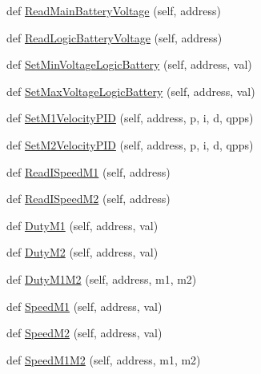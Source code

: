 \begin{DoxyCompactItemize}
\item 
def \mbox{\hyperlink{classtoxic__hardware_1_1roboclaw__3_1_1Roboclaw_abb5901cba752131303b0378bbaf59c38}{Read\+Main\+Battery\+Voltage}} (self, address)
\item 
def \mbox{\hyperlink{classtoxic__hardware_1_1roboclaw__3_1_1Roboclaw_aac164c773247f222999594aba2deae95}{Read\+Logic\+Battery\+Voltage}} (self, address)
\item 
def \mbox{\hyperlink{classtoxic__hardware_1_1roboclaw__3_1_1Roboclaw_adb683d1e84a0432cca192f662407904f}{Set\+Min\+Voltage\+Logic\+Battery}} (self, address, val)
\item 
def \mbox{\hyperlink{classtoxic__hardware_1_1roboclaw__3_1_1Roboclaw_a726fe4e542430464c2fc2bf14f5142a3}{Set\+Max\+Voltage\+Logic\+Battery}} (self, address, val)
\item 
def \mbox{\hyperlink{classtoxic__hardware_1_1roboclaw__3_1_1Roboclaw_a8ea4c0748b43e086bf7326ec1cd1d8f5}{Set\+M1\+Velocity\+P\+ID}} (self, address, p, i, d, qpps)
\item 
def \mbox{\hyperlink{classtoxic__hardware_1_1roboclaw__3_1_1Roboclaw_aea08bdecff46652920d96fc6239ae604}{Set\+M2\+Velocity\+P\+ID}} (self, address, p, i, d, qpps)
\item 
def \mbox{\hyperlink{classtoxic__hardware_1_1roboclaw__3_1_1Roboclaw_a26242513f458febf217714b304956f11}{Read\+I\+Speed\+M1}} (self, address)
\item 
def \mbox{\hyperlink{classtoxic__hardware_1_1roboclaw__3_1_1Roboclaw_aaac3abe9920b64707f1697b870bd16fd}{Read\+I\+Speed\+M2}} (self, address)
\item 
def \mbox{\hyperlink{classtoxic__hardware_1_1roboclaw__3_1_1Roboclaw_afd7c4865f7e4c723f66b5b51ce8069d3}{Duty\+M1}} (self, address, val)
\item 
def \mbox{\hyperlink{classtoxic__hardware_1_1roboclaw__3_1_1Roboclaw_a99a7bb8b0e944f465bbeb1b6722ef22c}{Duty\+M2}} (self, address, val)
\item 
def \mbox{\hyperlink{classtoxic__hardware_1_1roboclaw__3_1_1Roboclaw_a3f7c1baa59d28bf69d9beb6a83deab5f}{Duty\+M1\+M2}} (self, address, m1, m2)
\item 
def \mbox{\hyperlink{classtoxic__hardware_1_1roboclaw__3_1_1Roboclaw_af4f6babccd668312895a4a4b04a262d4}{Speed\+M1}} (self, address, val)
\item 
def \mbox{\hyperlink{classtoxic__hardware_1_1roboclaw__3_1_1Roboclaw_afa7cb556973974794bc2d040eabde676}{Speed\+M2}} (self, address, val)
\item 
def \mbox{\hyperlink{classtoxic__hardware_1_1roboclaw__3_1_1Roboclaw_ae8f0e90249e078ce5de6930dbabb338d}{Speed\+M1\+M2}} (self, address, m1, m2)

\end{DoxyCompactItemize}
